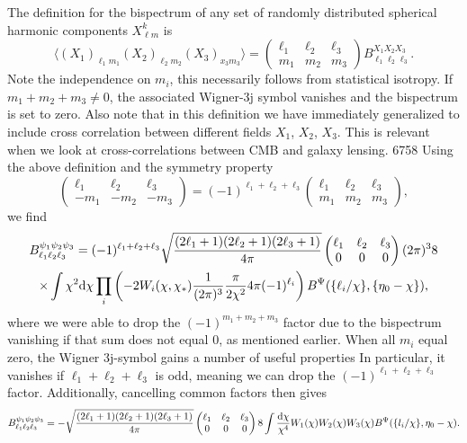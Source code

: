 \documentclass[11pt]{article} %
\DeclareRobustCommand{\d}{\ifmmode\text{d}\else d\fi}
\newcommand{\br}[1]{\ensuremath{\left( #1 \right)}}
\begin{document}
The definition for the bispectrum of any set of randomly distributed spherical harmonic components $X^k_{\ell m}$ is \cite{Hu2000}
\begin{equation*}
    \langle (X_1)_{\ell_1m_1}(X_2)_{\ell_2m_2}(X_3)_{x_3m_3} \rangle = \begin{pmatrix}
        \ell_1 & \ell_2 & \ell_3 \\ m_1 & m_2 & m_3
    \end{pmatrix}
    B_{\ell_1\ell_2\ell_3}^{X_1X_2X_3}.
\end{equation*}
Note the independence on $m_i$, this necessarily follows from statistical isotropy. %
If $m_1+m_2+m_3\neq 0$, the associated Wigner-3j symbol vanishes and the bispectrum is set to zero.
Also note that in this definition we have immediately generalized to include cross correlation between different fields $X_1$, $X_2$, $X_3$. This is relevant when we look at cross-correlations between CMB and galaxy lensing.
6758
Using the above definition and the symmetry property
\begin{equation*}
    \begin{pmatrix}
        \ell_1 & \ell_2 & \ell_3\\
        -m_1 & -m_2 & -m_3
      \end{pmatrix}
      =
      (-1)^{\ell_1+\ell_2+\ell_3}
      \begin{pmatrix}
        \ell_1 & \ell_2 & \ell_3\\
        m_1 & m_2 & m_3
      \end{pmatrix},
\end{equation*}
we find
\begin{gather*}
    B^{\psi_1\psi_2\psi_3}_{\ell_1\ell_2\ell_3}
    = (-1)^{\ell_1+\ell_2+\ell_3}
    \sqrt{\frac{(2\ell_1 + 1)(2\ell_2 + 1)(2\ell_3 + 1)}{4\pi}} \begin{pmatrix} \ell_1 & \ell_2 & \ell_3 \\ 0 & 0 & 0 \end{pmatrix}
    (2\pi)^3 8 \\
    \times \int \chi^2\d \chi\prod_i\br{-2 W_i(\chi, \chi_*)\frac{1}{(2\pi)^{3}}\frac{\pi}{2\chi^2}4\pi (-1)^{\ell_i}} B^\Psi(\{\ell_i/\chi\}, \{\eta_0-\chi\}),
\end{gather*}
where we were able to drop the $(-1)^{m_1+m_2+m_3}$ factor due to the bispectrum vanishing if that sum does not equal $0$, as mentioned earlier. When all $m_i$ equal zero, the Wigner 3j-symbol gains a number of useful properties %
In particular, it vanishes if $\ell_1+\ell_2+\ell_3$ is odd, meaning we can drop the $(-1)^{\ell_1+\ell_2+\ell_3}$ factor. Additionally, cancelling common factors then gives
\begin{align}
    B^{\psi_1\psi_2\psi_3}_{\ell_1\ell_2\ell_3}
    =
    -\sqrt{\frac{(2\ell_1 + 1)(2\ell_2 + 1)(2\ell_3 + 1)}{4\pi}} \begin{pmatrix} \ell_1 & \ell_2 & \ell_3 \\ 0 & 0 & 0 \end{pmatrix} 8 \int \frac{\d \chi }{\chi^4} W_1(\chi)W_2(\chi)W_3(\chi) B^\Psi(\{l_i/\chi\}, \eta_0-\chi). \label{eq:lbsintermsofpsi}
\end{align}
\end{document}
